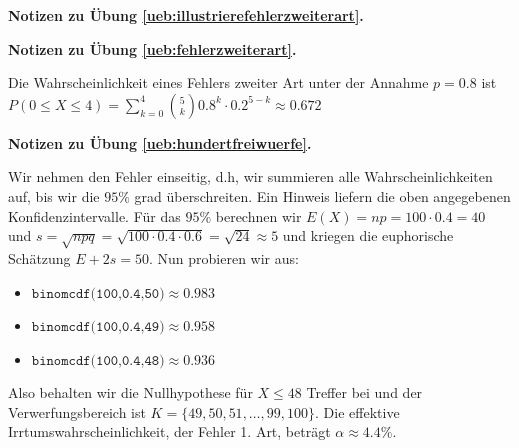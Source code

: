 \documentclass[%
11pt,%
twoside,%
titlepage,%
german,%
headsepline%
]{scrartcl}
\newcommand{\concatueb}[1]{ueb:#1}%
\newcommand{\concatlsg}[1]{lsg:#1}%
\newenvironment{lsg}[1]{%
    \par\noindent\textbf{Notizen zu Übung \ref{\concatueb{#1}}.}%
    \label{\concatlsg{#1}}
}{%
    \par%
}
\begin{document}
\begin{lsg}{illustrierefehlerzweiterart}
    \begin{center}
\end{center}
\end{lsg}
\begin{lsg}{fehlerzweiterart}
    Die Wahrscheinlichkeit eines Fehlers zweiter Art unter der Annahme $p=0.8$ ist $P(0\leq X\leq4)=\sum_{k=0}^4\binom{5}{k}0.8^k\cdot0.2^{5-k}\approx0.672$
\end{lsg}
\begin{lsg}{hundertfreiwuerfe}
    Wir nehmen den Fehler einseitig, d.h, wir summieren alle Wahrscheinlichkeiten auf, bis wir die $95\%$ grad überschreiten. Ein Hinweis liefern die oben angegebenen Konfidenzintervalle. Für das $95\%$ berechnen wir $E(X)=np=100\cdot0.4=40$ und $s=\sqrt{npq}=\sqrt{100\cdot0.4\cdot0.6}=\sqrt{24}\approx5$ und kriegen die euphorische Schätzung $E+2s=50$. Nun probieren wir aus:
    \begin{itemize}
        \item $\texttt{binomcdf(100,0.4,50)}\approx0.983$
        \item $\texttt{binomcdf(100,0.4,49)}\approx0.958$
        \item $\texttt{binomcdf(100,0.4,48)}\approx0.936$
    \end{itemize}
    Also behalten wir die Nullhypothese für $X\leq48$ Treffer bei und der Verwerfungsbereich ist $K=\{49,50,51,\dots,99,100\}$. Die effektive Irrtumswahrscheinlichkeit, der Fehler 1. Art, beträgt $\alpha\approx4.4\%$.
\end{lsg}
\end{document}
